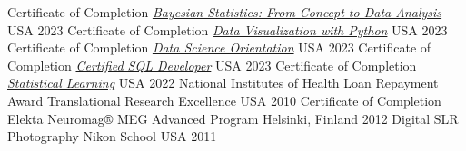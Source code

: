 


\begin{cvhonors}

  \cvhonor
    {Certificate of Completion} %
    {\href{https://www.coursera.org/account/accomplishments/certificate/DR5CTTN4HL35}{\emph{Bayesian Statistics: From Concept to Data Analysis}}} %
    {USA}
    {2023}
  \cvhonor
    {Certificate of Completion} %
    {\href{https://www.coursera.org/account/accomplishments/certificate/G4G3368QTG2N}{\emph{Data Visualization with Python}}} %
    {USA} %
    {2023} %
  \cvhonor
    {Certificate of Completion} %
    {\href{https://www.coursera.org/account/accomplishments/certificate/HM6YZKUP8J8X}{\emph{Data Science Orientation}}} %
    {USA} %
    {2023} %
  \cvhonor
    {Certificate of Completion} %
    {\href{https://verify.w3schools.com/1NDRG69DTP}{\emph{Certified SQL Developer}}} %
    {USA} %
    {2023} %
  \cvhonor
    {Certificate of Completion} %
    {\href{https://courses.edx.org/certificates/6def26e9529b4ded83ebfe2e86e7e0da}{\emph{Statistical Learning}}} %
    {USA} %
    {2022} %
  \cvhonor
    {National Institutes of Health Loan Repayment Award} %
    {Translational Research Excellence} %
    {USA} %
    {2010} %
  \cvhonor
    {Certificate of Completion} %
    {Elekta Neuromag® MEG Advanced Program} %
    {Helsinki, Finland} %
    {2012} %
  \cvhonor
    {Digital SLR Photography} %
    {Nikon School} %
    {USA} %
    {2011} %
\end{cvhonors}
